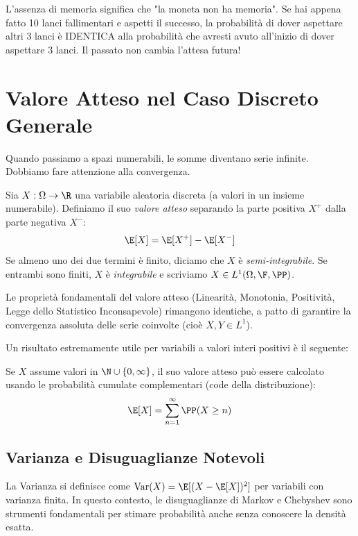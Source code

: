 \begin{spiegazione}
    L'assenza di memoria significa che "la moneta non ha memoria". Se hai appena fatto 10 lanci fallimentari e aspetti il successo, la probabilità di dover aspettare altri 3 lanci è IDENTICA alla probabilità che avresti avuto all'inizio di dover aspettare 3 lanci. Il passato non cambia l'attesa futura!
\end{spiegazione}

\section{Valore Atteso nel Caso Discreto Generale}

Quando passiamo a spazi numerabili, le somme diventano serie infinite. Dobbiamo fare attenzione alla convergenza. 

\begin{definition}
Sia $X : \Omega \to \R$ una variabile aleatoria discreta (a valori in un insieme numerabile). Definiamo il suo \emph{valore atteso} separando la parte positiva $X^+$ dalla parte negativa $X^-$:
\[ \E[X] = \E[X^+] - \E[X^-] \]
Se almeno uno dei due termini è finito, diciamo che $X$ è \emph{semi-integrabile}. Se entrambi sono finiti, $X$ è \emph{integrabile} e scriviamo $X \in L^1(\Omega, \F, \PP)$.
\end{definition}

Le proprietà fondamentali del valore atteso (Linearità, Monotonia, Positività, Legge dello Statistico Inconsapevole) rimangono identiche, a patto di garantire la convergenza assoluta delle serie coinvolte (cioè $X, Y \in L^1$).

Un risultato estremamente utile per variabili a valori interi positivi è il seguente:
\begin{theorem}
Se $X$ assume valori in $\N \cup \{0, \infty\}$, il suo valore atteso può essere calcolato usando le probabilità cumulate complementari (code della distribuzione):
\[ \E[X] = \sum_{n=1}^\infty \PP(X \ge n) \]
\end{theorem}

\subsection{Varianza e Disuguaglianze Notevoli}
La Varianza si definisce come $\operatorname{Var}(X) = \E[(X-\E[X])^2]$ per variabili con varianza finita. In questo contesto, le disuguaglianze di Markov e Chebyshev sono strumenti fondamentali per stimare probabilità anche senza conoscere la densità esatta.

